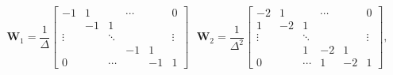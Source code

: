 \[{{\mathbf{W}}_1} = \frac{1}{\Delta }\left[ {\begin{array}{*{20}{c}}
  { - 1}&1&{}& \cdots &{}&0 \\ 
  {}&{ - 1}&1&{}&{}&{} \\ 
   \vdots &{}& \ddots &{}&{}& \vdots  \\ 
  {}&{}&{}&{ - 1}&1&{} \\ 
  0&{}& \cdots &{}&{ - 1}&1 
\end{array}} \right]{\text{      }}{{\mathbf{W}}_2} = \frac{1}{{{\Delta ^2}}}\left[ {\begin{array}{*{20}{c}}
  { - 2}&1&{}& \cdots &{}&0 \\ 
  1&{ - 2}&1&{}&{}&{} \\ 
   \vdots &{}& \ddots &{}&{}& \vdots  \\ 
  {}&{}&1&{ - 2}&1&{} \\ 
  0&{}& \cdots &1&{ - 2}&1 
\end{array}} \right],\]%



